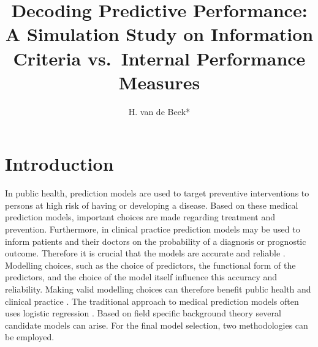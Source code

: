 \documentclass[AMA,STIX1COL]{WileyNJD-v5}
\begin{document}
\title{Decoding Predictive Performance: A Simulation Study on
Information Criteria vs.~Internal Performance Measures}

\author[a,b]{H. van de Beek*}



\address[a]{Methods and Statistics, Utrecht University, the Netherlands}
\address[b]{Julius Center for Health Sciences and Primary Care, UMC
Utrecht, the Netherlands}







\maketitle



\hypertarget{sec1}{%
\section{Introduction}\label{sec1}}

In public health, prediction models are used to target preventive
interventions to persons at high risk of having or developing a disease.
Based on these medical prediction models, important choices are made
regarding treatment and prevention. Furthermore, in clinical practice
prediction models may be used to inform patients and their doctors on
the probability of a diagnosis or prognostic outcome. Therefore it is
crucial that the models are accurate and reliable
\citep{moonsPrognosisPrognosticResearch2009}. Modelling choices, such as
the choice of predictors, the functional form of the predictors, and the
choice of the model itself influence this accuracy and reliability.
Making valid modelling choices can therefore benefit public health and
clinical practice \citep{wesslerTuftsPACEClinical2017}. The traditional
approach to medical prediction models often uses logistic regression
\citep{steyerbergApplicationsPredictionModels2009}. Based on field
specific background theory several candidate models can arise. For the
final model selection, two methodologies can be employed.
\end{document}
